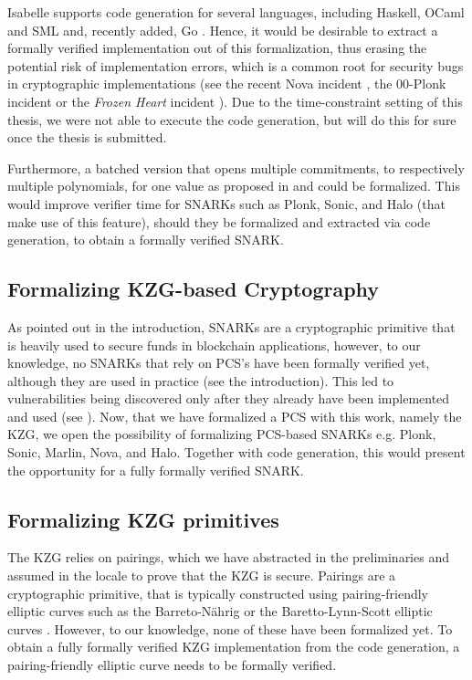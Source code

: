 Isabelle supports code generation for several languages, including Haskell, OCaml and SML \parencite{code_gen} and, recently added, Go \parencite{go_codegen}. Hence, it would be desirable to extract a formally verified implementation out of this formalization, thus erasing the potential risk of implementation errors, which is a common root for security bugs in cryptographic implementations (see the recent Nova incident \parencite{nova_bug}, the 00-Plonk incident \parencite{00Plonk} or the \textit{Frozen Heart} incident \parencite{FHPlonk}). Due to the time-constraint setting of this thesis, we were not able to execute the code generation, but will do this for sure once the thesis is submitted.

Furthermore, a batched version that opens multiple commitments, to respectively multiple polynomials, for one value as proposed in \parencite{plonk} and \parencite{sonic} could be formalized. This would improve verifier time for SNARKs such as Plonk, Sonic, and Halo (that make use of this feature), should they be formalized and extracted via code generation, to obtain a formally verified SNARK.

\subsection*{Formalizing KZG-based Cryptography}
As pointed out in the introduction, SNARKs are a cryptographic primitive that is heavily used to secure funds in blockchain applications, however, to our knowledge, no SNARKs that rely on PCS's have been formally verified yet, although they are used in practice (see the introduction). This led to vulnerabilities being discovered only after they already have been implemented and used (see \parencite{FHBulletproofs}). Now, that we have formalized a PCS with this work, namely the KZG, we open the possibility of formalizing PCS-based SNARKs e.g. Plonk, Sonic, Marlin, Nova, and Halo. Together with code generation, this would present the opportunity for a fully formally verified SNARK. 

\subsection*{Formalizing KZG primitives}
The KZG relies on pairings, which we have abstracted in the preliminaries and assumed in the locale to prove that the KZG is secure. Pairings are a cryptographic primitive, that is typically constructed using pairing-friendly elliptic curves such as the Barreto-Nährig\parencite{BN-EC} or the Baretto-Lynn-Scott\parencite{BLS-EC} elliptic curves \parencite{boneh_shoup}. However, to our knowledge, none of these have been formalized yet. To obtain a fully formally verified KZG implementation from the code generation, a pairing-friendly elliptic curve needs to be formally verified.